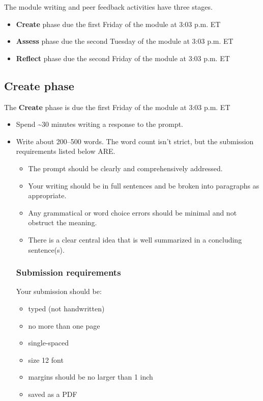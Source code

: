 \documentclass[
  openany]{book}
\begin{document}
The module writing and peer feedback activities have three stages.

\begin{itemize}
\item
  \textbf{Create} phase due the first Friday of the module at 3:03 p.m. ET
\item
  \textbf{Assess} phase due the second Tuesday of the module at 3:03 p.m. ET
\item
  \textbf{Reflect} phase due the second Friday of the module at 3:03 p.m. ET
\end{itemize}

\hypertarget{create-phase}{%
\subsection{Create phase}\label{create-phase}}

The \textbf{Create} phase is due the first Friday of the module at 3:03 p.m. ET

\begin{itemize}
\item
  Spend \textasciitilde30 minutes writing a response to the prompt.
\item
  Write about 200--500 words. The word count isn't strict, but the submission requirements listed below ARE.

  \begin{itemize}
  \item
    The prompt should be clearly and comprehensively addressed.
  \item
    Your writing should be in full sentences and be broken into paragraphs as appropriate.
  \item
    Any grammatical or word choice errors should be minimal and not obstruct the meaning.
  \item
    There is a clear central idea that is well summarized in a concluding sentence(s).
  \end{itemize}

  \hypertarget{submission-requirements}{%
  \subsubsection{Submission requirements}\label{submission-requirements}}

  Your submission should be:

  \begin{itemize}
  \item
    typed (not handwritten)
  \item
    no more than one page
  \item
    single-spaced
  \item
    size 12 font
  \item
    margins should be no larger than 1 inch
  \item
    saved as a PDF
  \end{itemize}
\end{itemize}
\end{document}
